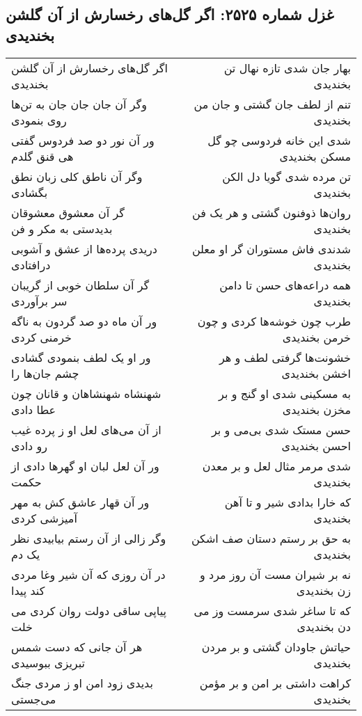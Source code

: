 \begin{center}
\section*{غزل شماره ۲۵۲۵: اگر گل‌های رخسارش از آن گلشن بخندیدی}
\label{sec:2525}
\begin{longtable}{l p{0.5cm} r}
اگر گل‌های رخسارش از آن گلشن بخندیدی
&&
بهار جان شدی تازه نهال تن بخندیدی
\\
وگر آن جان جان جان به تن‌ها روی بنمودی
&&
تنم از لطف جان گشتی و جان من بخندیدی
\\
ور آن نور دو صد فردوس گفتی هی قنق گلدم
&&
شدی این خانه فردوسی چو گل مسکن بخندیدی
\\
وگر آن ناطق کلی زبان نطق بگشادی
&&
تن مرده شدی گویا دل الکن بخندیدی
\\
گر آن معشوق معشوقان بدیدستی به مکر و فن
&&
روان‌ها ذوفنون گشتی و هر یک فن بخندیدی
\\
دریدی پرده‌ها از عشق و آشوبی درافتادی
&&
شدندی فاش مستوران گر او معلن بخندیدی
\\
گر آن سلطان خوبی از گریبان سر برآوردی
&&
همه دراعه‌های حسن تا دامن بخندیدی
\\
ور آن ماه دو صد گردون به ناگه خرمنی کردی
&&
طرب چون خوشه‌ها کردی و چون خرمن بخندیدی
\\
ور او یک لطف بنمودی گشادی چشم جان‌ها را
&&
خشونت‌ها گرفتی لطف و هر اخشن بخندیدی
\\
شهنشاه شهنشاهان و قانان چون عطا دادی
&&
به مسکینی شدی او گنج و بر مخزن بخندیدی
\\
از آن می‌های لعل او ز پرده غیب رو دادی
&&
حسن مستک شدی بی‌می و بر احسن بخندیدی
\\
ور آن لعل لبان او گهرها دادی از حکمت
&&
شدی مرمر مثال لعل و بر معدن بخندیدی
\\
ور آن قهار عاشق کش به مهر آمیزشی کردی
&&
که خارا بدادی شیر و تا آهن بخندیدی
\\
وگر زالی از آن رستم بیابیدی نظر یک دم
&&
به حق بر رستم دستان صف اشکن بخندیدی
\\
در آن روزی که آن شیر وغا مردی کند پیدا
&&
نه بر شیران مست آن روز مرد و زن بخندیدی
\\
پیاپی ساقی دولت روان کردی می خلت
&&
که تا ساغر شدی سرمست وز می دن بخندیدی
\\
هر آن جانی که دست شمس تبریزی ببوسیدی
&&
حیاتش جاودان گشتی و بر مردن بخندیدی
\\
بدیدی زود امن او ز مردی جنگ می‌جستی
&&
کراهت داشتی بر امن و بر مؤمن بخندیدی
\\
\end{longtable}
\end{center}
